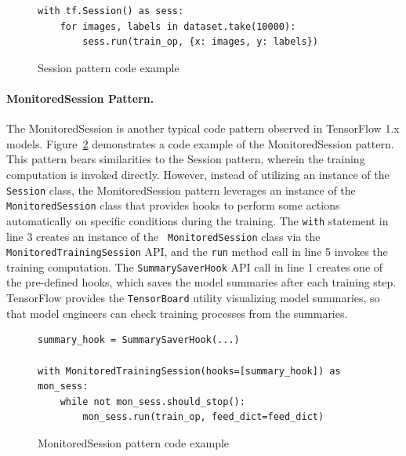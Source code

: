 \begin{figure}[!ht]
\begin{lstlisting}[style=mpython]
with tf.Session() as sess:
    for images, labels in dataset.take(10000):
        sess.run(train_op, {x: images, y: labels})
\end{lstlisting}
\caption{Session pattern code example}
\label{fig:sessionpattern}
\end{figure}




\paragraph{MonitoredSession Pattern.}
The MonitoredSession is another typical code pattern observed in
TensorFlow 1.x models. 
Figure~\ref{fig:monsesspattern} demonstrates a code example of the
MonitoredSession pattern.
This pattern bears similarities to the Session pattern, wherein the training
computation is invoked directly.
However, instead of utilizing an instance of the {\tt Session} class, the
MonitoredSession pattern leverages an instance of the {\tt
MonitoredSession} class that provides hooks to perform some actions
automatically on specific conditions during the training.
The {\tt with} statement in line 3 creates an instance of the {\tt
MonitoredSession} class via the {\tt MonitoredTrainingSession} API, and the
{\tt run} method call in line 5 invokes the training computation.
The {\tt SummarySaverHook} API call in line 1 creates one of the pre-defined
hooks, which saves the model summaries after each training step. 
TensorFlow provides the {\tt TensorBoard} utility visualizing model summaries,
so that model engineers can check training processes from the summaries.

\begin{figure}[!ht]
  \begin{lstlisting}[style=mpython]
summary_hook = SummarySaverHook(...)

with MonitoredTrainingSession(hooks=[summary_hook]) as mon_sess:
    while not mon_sess.should_stop():
        mon_sess.run(train_op, feed_dict=feed_dict)\end{lstlisting}
  \caption{MonitoredSession pattern code example}
  \label{fig:monsesspattern}
\end{figure}

